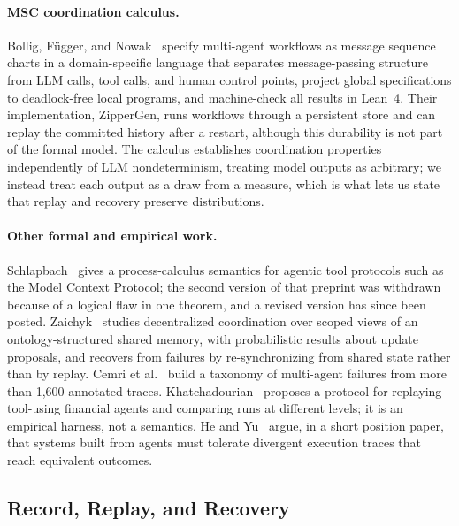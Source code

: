\paragraph{MSC coordination calculus.}
Bollig, F\"{u}gger, and Nowak~\citep{bollig2026msc} specify multi-agent workflows as message
sequence charts in a domain-specific language that separates message-passing structure from
LLM calls, tool calls, and human control points, project global specifications to
deadlock-free local programs, and machine-check all results in Lean~4.
Their implementation, ZipperGen, runs workflows through a persistent store and can replay the
committed history after a restart, although this durability is not part of the formal model.
The calculus establishes coordination properties independently of LLM nondeterminism, treating
model outputs as arbitrary; we instead treat each output as a draw from a measure, which is
what lets us state that replay and recovery preserve distributions.

\paragraph{Other formal and empirical work.}
Schlapbach~\citep{schlapbach2026mcp} gives a process-calculus semantics for agentic tool
protocols such as the Model Context Protocol; the second version of that preprint was withdrawn
because of a logical flaw in one theorem, and a revised version has since been posted.
Zaichyk~\citep{semanticfusion2026} studies decentralized coordination over scoped views of an
ontology-structured shared memory, with probabilistic results about update proposals, and
recovers from failures by re-synchronizing from shared state rather than by replay.
Cemri et al.~\citep{cemri2025mast} build a taxonomy of multi-agent failures from more than
1{,}600 annotated traces.
Khatchadourian~\citep{khatchadourian2026replayable} proposes a protocol for replaying tool-using
financial agents and comparing runs at different levels; it is an empirical harness, not a
semantics.
He and Yu~\citep{he2026postdeterministic} argue, in a short position paper, that systems built
from agents must tolerate divergent execution traces that reach equivalent outcomes.

\subsection{Record, Replay, and Recovery}

